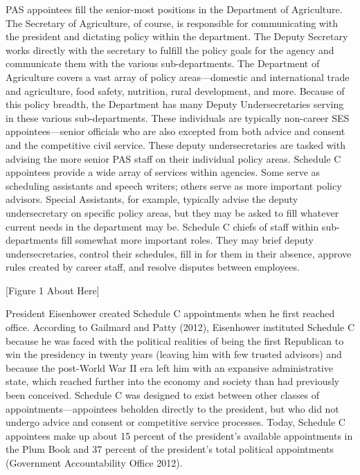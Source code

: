 \documentclass[12pt]{article}
\begin{document}
PAS appointees fill the senior-most positions in the Department of Agriculture. The Secretary of Agriculture, of course, is responsible for communicating with the president and dictating policy within the department. The Deputy Secretary works directly with the secretary to fulfill the policy goals for the agency and communicate them with the various sub-departments. The Department of Agriculture covers a vast array of policy areas---domestic and international trade and agriculture, food safety, nutrition, rural development, and more. Because of this policy breadth, the Department has many Deputy Undersecretaries serving in these various sub-departments. These individuals are typically non-career SES appointees---senior officials who are also excepted from both advice and consent and the competitive civil service. These deputy undersecretaries are tasked with advising the more senior PAS staff on their individual policy areas. Schedule C appointees provide a wide array of services within agencies. Some serve as scheduling assistants and speech writers; others serve as more important policy advisors. Special Assistants, for example, typically advise the deputy undersecretary on specific policy areas, but they may be asked to fill whatever current needs in the department may be. Schedule C chiefs of staff within sub-departments fill somewhat more important roles. They may brief deputy undersecretaries, control their schedules, fill in for them in their absence, approve rules created by career staff, and resolve disputes between employees. 
	
\begin{center}[Figure 1 About Here]	\end{center}

	President Eisenhower created Schedule C appointments when he first reached office. According to Gailmard and Patty (2012), Eisenhower instituted Schedule C because he was faced with the political realities of being the first Republican to win the presidency in twenty years (leaving him with few trusted advisors) and because the post-World War II era left him with an expansive administrative state, which reached further into the economy and society than had previously been conceived. Schedule C was designed to exist between other classes of appointments---appointees beholden directly to the president, but who did not undergo advice and consent or competitive service processes. Today, Schedule C appointees make up about 15 percent of the president's available appointments in the Plum Book and 37 percent of the president's total political appointments (Government Accountability Office 2012).
	
\end{document}
